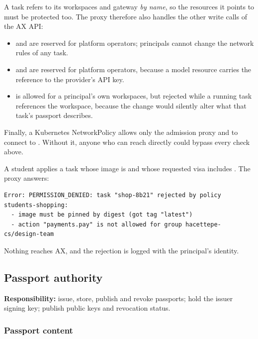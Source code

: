 A task refers to its workspaces and gateway \emph{by name}, so the resources it points to must be protected too. The proxy therefore also handles the other write calls of the AX API:

\begin{itemize}
  \item {} and  are reserved for platform operators; principals cannot change the network rules of any task.
  \item {} and  are reserved for platform operators, because a model resource carries the reference to the provider's API key.
  \item {} is allowed for a principal's own workspaces, but rejected while a running task references the workspace, because the change would silently alter what that task's passport describes.
\end{itemize}

Finally, a Kubernetes NetworkPolicy allows only the admission proxy and  to connect to . Without it, anyone who can reach  directly could bypass every check above.

\begin{example}
A student applies a task whose image is  and whose requested visa includes . The proxy answers:
\begin{lstlisting}[language={}]
Error: PERMISSION_DENIED: task "shop-8b21" rejected by policy students-shopping:
  - image must be pinned by digest (got tag "latest")
  - action "payments.pay" is not allowed for group hacettepe-cs/design-team
\end{lstlisting}
Nothing reaches AX, and the rejection is logged with the principal's identity.
\end{example}

\subsection{Passport authority}

\textbf{Responsibility:} issue, store, publish and revoke passports; hold the issuer signing key; publish public keys and revocation status.

\subsubsection{Passport content}

